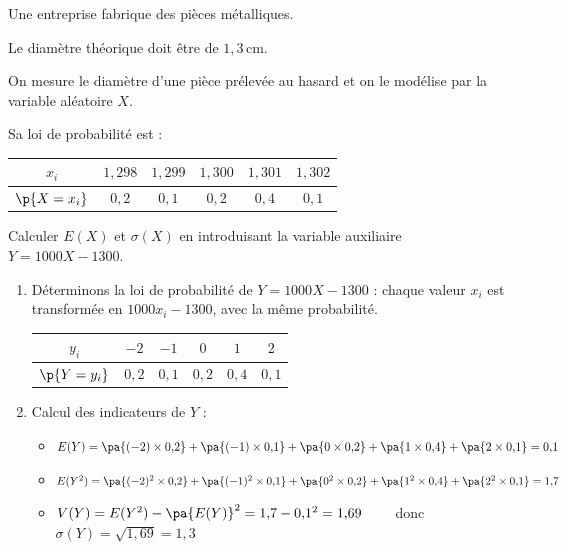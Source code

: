 \begin{methode}
	Une entreprise fabrique des pièces métalliques.

	Le diamètre théorique doit être de $1{,}3\,\text{cm}$.

	On mesure le diamètre d'une pièce prélevée au hasard et on le modélise par la variable aléatoire $X$.

	Sa loi de probabilité est :
	\begin{center}
		\begin{tabular}{|c|c|c|c|c|c|} \hline
			\ccg$x_i$                               & $1{,}298$ & $1{,}299$ & $1{,}300$ & $1{,}301$ & $1{,}302$ \\ \hline
			\ccg\rule[-4mm]{0mm}{11mm}$\p{X = x_i}$ & $0{,}2$   & $0{,}1$   & $0{,}2$   & $0{,}4$   & $0{,}1$   \\ \hline
		\end{tabular}
	\end{center}

	Calculer $E(X)$ et $\sigma(X)$ en introduisant la variable auxiliaire $Y = 1000X - 1300$.

	\newpage

	\begin{correction}
		\nline
		\begin{enumerate}
			\item Déterminons la loi de probabilité de $Y = 1000X - 1300$ : chaque valeur $x_i$ est transformée en $1000 x_i - 1300$, avec la même probabilité.
			      \begin{center}
				      \begin{tabular}{|c|c|c|c|c|c|} \hline
					      \ccg$y_i$                               & $-2$    & $-1$    & $0$     & $1$     & $2$     \\ \hline
					      \ccg\rule[-4mm]{0mm}{11mm}$\p{Y = y_i}$ & $0{,}2$ & $0{,}1$ & $0{,}2$ & $0{,}4$ & $0{,}1$ \\ \hline
				      \end{tabular}
			      \end{center}

			\item Calcul des indicateurs de $Y$ :
			      \begin{itemize}
				      \item $E(Y) = \pa{(-2) \times 0{,}2} + \pa{(-1) \times 0{,}1} + \pa{0 \times 0{,}2} + \pa{1 \times 0{,}4} + \pa{2 \times 0{,}1} = 0{,}1$
				      \item $E(Y^2) = \pa{(-2)^2 \times 0{,}2} + \pa{(-1)^2 \times 0{,}1} + \pa{0^2 \times 0{,}2} + \pa{1^2 \times 0{,}4} + \pa{2^2 \times 0{,}1} = 1{,}7$
				      \item $V(Y) = E(Y^2) - \pa{E(Y)}^2 = 1{,}7 - 0{,}1^2 = 1{,}69\qquad$ donc $\sigma(Y) = \sqrt{1{,}69} = 1{,}3$
			      \end{itemize}


\end{enumerate}
\end{correction}
\end{methode}
